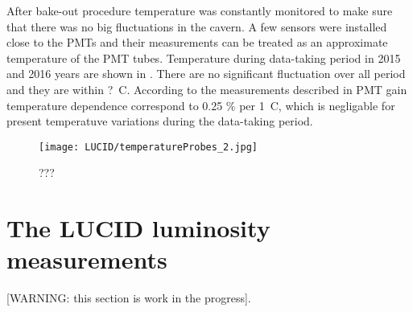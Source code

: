 After bake-out procedure temperature was constantly monitored to make sure that there was no big fluctuations in the cavern.
A few sensors were installed close to the PMTs and their measurements can be treated as an approximate temperature of the PMT tubes.
Temperature during data-taking period in 2015 and 2016 years are shown in . 
There are no significant fluctuation over all period and they are within ?\degree~C.
According to the measurements described in  PMT gain temperature dependence correspond
to 0.25 $\%$ per 1\degree~C, which is negligable for present temperatuve variations during the data-taking period.




\begin{figure}
\centering
\texttt{[image: LUCID/temperatureProbes\_2.jpg]}
\caption{???}
\label{fig:temperatureProbes_VJCone}
\end{figure}





 

\section{The LUCID luminosity measurements}

[WARNING: this section is work in the progress].

